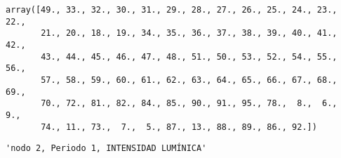 \documentclass[11pt]{article}
\begin{document}
    
    
    \begin{verbatim}
array([49., 33., 32., 30., 31., 29., 28., 27., 26., 25., 24., 23., 22.,
       21., 20., 18., 19., 34., 35., 36., 37., 38., 39., 40., 41., 42.,
       43., 44., 45., 46., 47., 48., 51., 50., 53., 52., 54., 55., 56.,
       57., 58., 59., 60., 61., 62., 63., 64., 65., 66., 67., 68., 69.,
       70., 72., 81., 82., 84., 85., 90., 91., 95., 78.,  8.,  6.,  9.,
       74., 11., 73.,  7.,  5., 87., 13., 88., 89., 86., 92.])
    \end{verbatim}

    
    
    \begin{verbatim}
'nodo 2, Periodo 1, INTENSIDAD LUMÍNICA'
    \end{verbatim}

    
    
\end{document}
